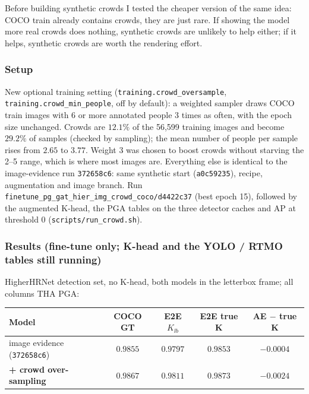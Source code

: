 Before building synthetic crowds I tested the cheaper version of the same idea: COCO train already contains crowds, they are just rare. If showing the model more real crowds does nothing, synthetic crowds are unlikely to help either; if it helps, synthetic crowds are worth the rendering effort.

\subsubsection{Setup}

New optional training setting (\texttt{training.crowd\_oversample}, \texttt{training.crowd\_min\_people}, off by default): a weighted sampler draws COCO train images with 6 or more annotated people 3 times as often, with the epoch size unchanged. Crowds are $12.1\%$ of the 56,599 training images and become $29.2\%$ of samples (checked by sampling); the mean number of people per sample rises from $2.65$ to $3.77$. Weight 3 was chosen to boost crowds without starving the 2--5 range, which is where most images are.
Everything else is identical to the image-evidence run \texttt{372658c6}: same synthetic start (\texttt{a0c59235}), recipe, augmentation and image branch. Run \texttt{finetune\_pg\_gat\_hier\_img\_crowd\_coco/d4422c37} (best epoch 15), followed by the augmented K-head, the PGA tables on the three detector caches and AP at threshold 0 (\texttt{scripts/run\_crowd.sh}).

\subsubsection{Results (fine-tune only; K-head and the YOLO / RTMO tables still running)}

HigherHRNet detection set, no K-head, both models in the letterbox frame; all columns THA PGA:

\begin{tabular}{lcccc}
\hline
\textbf{Model} & \textbf{COCO GT} & \textbf{E2E $K_{lb}$} & \textbf{E2E true K} & \textbf{AE $-$ true K} \\
\hline
image evidence (\texttt{372658c6})          & $0.9855$ & $0.9797$ & $0.9853$ & $-0.0004$ \\
\textbf{+ crowd over-sampling}        & $\mathbf{0.9867}$ & $\mathbf{0.9811}$ & $\mathbf{0.9873}$ & $\mathbf{-0.0024}$ \\
\hline
\end{tabular}

\vspace{0.5em}

